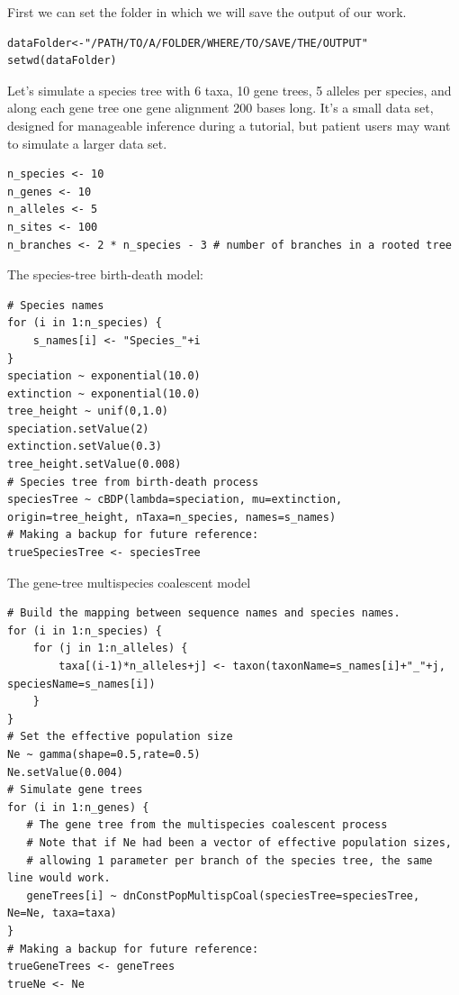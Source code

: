 \documentclass[11pt]{article}
\begin{document}
{\begin{framed}
First we can set the folder in which we will save the output of our work.
 {\tt \begin{snugshade*}
\begin{lstlisting}
dataFolder<-"/PATH/TO/A/FOLDER/WHERE/TO/SAVE/THE/OUTPUT"
setwd(dataFolder)
\end{lstlisting}
\end{snugshade*}}

Let's simulate a species tree with 6 taxa, 10 gene trees, 5 alleles per species, and along each gene tree one gene alignment 200 bases long.
It's a small data set, designed for manageable inference during a tutorial, but patient users may want to simulate a larger data set.

 {\tt \begin{snugshade*}
\begin{lstlisting}
n_species <- 10
n_genes <- 10
n_alleles <- 5
n_sites <- 100
n_branches <- 2 * n_species - 3 # number of branches in a rooted tree
\end{lstlisting}
\end{snugshade*}}

The species-tree birth-death model:

 {\tt \begin{snugshade*}
\begin{lstlisting}
# Species names
for (i in 1:n_species) {
	s_names[i] <- "Species_"+i
}
speciation ~ exponential(10.0)
extinction ~ exponential(10.0)
tree_height ~ unif(0,1.0)
speciation.setValue(2)
extinction.setValue(0.3)
tree_height.setValue(0.008)
# Species tree from birth-death process
speciesTree ~ cBDP(lambda=speciation, mu=extinction, origin=tree_height, nTaxa=n_species, names=s_names)
# Making a backup for future reference:
trueSpeciesTree <- speciesTree
\end{lstlisting}
\end{snugshade*}}

The gene-tree multispecies coalescent model
 {\tt \begin{snugshade*}
\begin{lstlisting}
# Build the mapping between sequence names and species names.
for (i in 1:n_species) {
	for (j in 1:n_alleles) {
		taxa[(i-1)*n_alleles+j] <- taxon(taxonName=s_names[i]+"_"+j, speciesName=s_names[i])
	}
}
# Set the effective population size
Ne ~ gamma(shape=0.5,rate=0.5)
Ne.setValue(0.004)
# Simulate gene trees
for (i in 1:n_genes) {
   # The gene tree from the multispecies coalescent process
   # Note that if Ne had been a vector of effective population sizes, 
   # allowing 1 parameter per branch of the species tree, the same line would work.
   geneTrees[i] ~ dnConstPopMultispCoal(speciesTree=speciesTree, Ne=Ne, taxa=taxa)
}
# Making a backup for future reference:
trueGeneTrees <- geneTrees
trueNe <- Ne
\end{lstlisting}
\end{snugshade*}}


\end{framed}}
\end{document}
